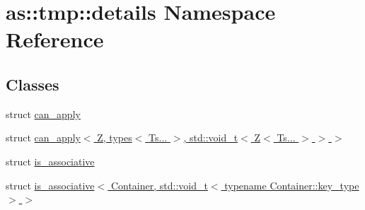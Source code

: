 \hypertarget{namespaceas_1_1tmp_1_1details}{}\section{as\+:\+:tmp\+:\+:details Namespace Reference}
\label{namespaceas_1_1tmp_1_1details}
\subsection*{Classes}
\begin{DoxyCompactItemize}
\item 
struct \hyperlink{structas_1_1tmp_1_1details_1_1can__apply}{can\+\_\+apply}
\item 
struct \hyperlink{structas_1_1tmp_1_1details_1_1can__apply_3_01Z_00_01types_3_01Ts_8_8_8_01_4_00_01std_1_1void__t_d0380c4f39b26cf3dcf2ed45500ba357}{can\+\_\+apply$<$ Z, types$<$ Ts... $>$, std\+::void\+\_\+t$<$ Z$<$ Ts... $>$ $>$ $>$}
\item 
struct \hyperlink{structas_1_1tmp_1_1details_1_1is__associative}{is\+\_\+associative}
\item 
struct \hyperlink{structas_1_1tmp_1_1details_1_1is__associative_3_01Container_00_01std_1_1void__t_3_01typename_01Container_1_1key__type_01_4_01_4}{is\+\_\+associative$<$ Container, std\+::void\+\_\+t$<$ typename Container\+::key\+\_\+type $>$ $>$}
\end{DoxyCompactItemize}
